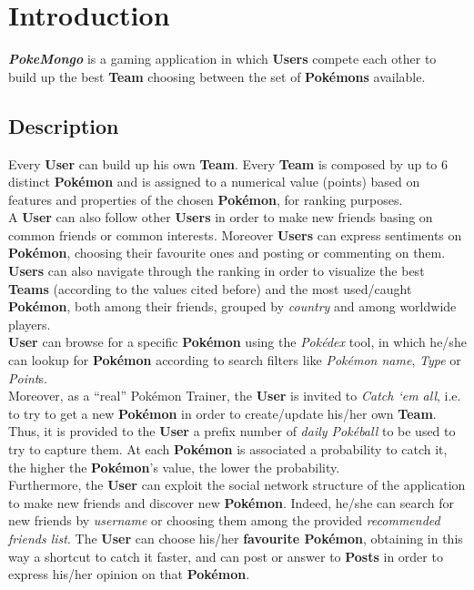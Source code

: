 \section{Introduction}
\textbf{\textit{PokeMongo}} is a gaming application in which \textbf{Users} compete each other to build up the best \textbf{Team} choosing between the set of \textbf{Pokémons} available. 

\subsection{Description}
Every \textbf{User} can build up his own \textbf{Team}. Every \textbf{Team} is composed by up to 6 distinct \textbf{Pokémon} and is assigned to a numerical value (points) based on features and properties of the chosen \textbf{Pokémon}, for ranking purposes.\medskip \\
A \textbf{User} can also follow other \textbf{Users} in order to make new friends basing on common friends or common interests. Moreover \textbf{Users} can express sentiments on \textbf{Pokémon}, choosing their favourite ones and posting or commenting on them. \medskip \\
\textbf{Users} can also navigate through the ranking in order to visualize the best \textbf{Teams} (according to the values cited before) and the most used/caught \textbf{Pokémon}, both among their friends, grouped by \textit{country} and among worldwide players.\medskip \\
\textbf{User} can browse for a specific \textbf{Pokémon} using the \textit{Pokédex} tool, in which he/she can lookup for \textbf{Pokémon} according to search filters like \textit{Pokémon name}, \textit{Type} or \textit{Point}s.\medskip \\
Moreover, as a “real” Pokémon Trainer, the \textbf{User} is invited to \textit{Catch ‘em all}, i.e. to try to get a new \textbf{Pokémon} in order to create/update his/her own \textbf{Team}. Thus, it is provided to the \textbf{User} a prefix number of \textit{daily Pokéball} to be used to try to capture them. At each \textbf{Pokémon} is associated a probability to catch it, the higher the \textbf{Pokémon}’s value, the lower the probability.\medskip \\
Furthermore, the \textbf{User} can exploit the social network structure of the application to make new friends and discover new \textbf{Pokémon}. Indeed, he/she can search for new friends by \textit{username} or choosing them among the provided \textit{recommended friends list}. 
The \textbf{User} can choose his/her \textbf{favourite Pokémon}, obtaining in this way a shortcut to catch it faster, and can post or answer to \textbf{Posts} in order to express his/her opinion on that \textbf{Pokémon}. \medskip \\
